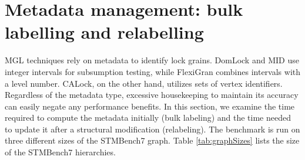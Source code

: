 




\section{Metadata management: bulk labelling and relabelling} \label
{benchmark:labellingAndRelabelling}
 
MGL techniques rely on metadata to identify lock grains. DomLock and MID use integer intervals for subsumption testing, while FlexiGran combines intervals with a level number. CALock, on the other hand, utilizes sets of vertex identifiers. Regardless of the metadata type, excessive housekeeping to maintain its accuracy can easily negate any performance benefits. In this section, we examine the time required to compute the metadata initially (bulk labeling) and the time needed to update it after a structural modification (relabeling). The benchmark is run on three different sizes of the STMBench7 graph. Table \ref{tab:graphSizes} lists the size of the STMBench7 hierarchies.

